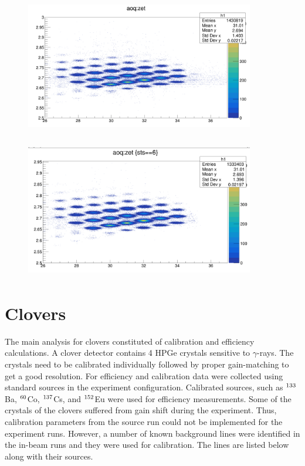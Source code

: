 \begin{figure}[h]
	\centering
	\includegraphics[width=10cm,height=6cm]{figures/PID_uncleaned.png}
	\caption[]{}
	\label{fig:PID_uncleaned_F7}
\end{figure}


\begin{figure}[h]
	\centering
	\includegraphics[width=10cm,height=6cm]{figures/PID_cleaned.png}
	\caption[]{}
	\label{fig:PID_cleaned_F7}
\end{figure}

\newpage

\section{Clovers}

The main analysis for clovers constituted of calibration and efficiency calculations. A clover detector contains 4 HPGe crystals sensitive to $\gamma$-rays. The crystals need to be calibrated individually followed by proper gain-matching to get a good resolution. For efficiency and calibration data were collected using standard sources in the experiment configuration. Calibrated sources, such as $\textsuperscript{133}$Ba, $\textsuperscript{60}$Co, $\textsuperscript{137}$Cs, and $\textsuperscript{152}$Eu were used for efficiency measurements. Some of the crystals of the clovers suffered from gain shift during the experiment. Thus, calibration parameters from the source run could not be implemented for the experiment runs. However, a number of known background lines were identified in the in-beam runs and they were used for calibration. The lines are listed below along with their sources.

